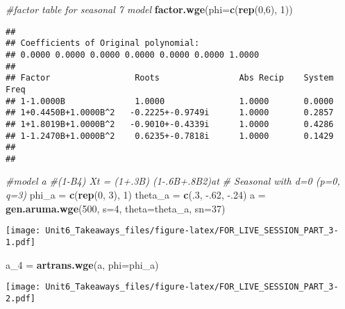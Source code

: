 \documentclass[
]{article}
\newenvironment{Shaded}{\begin{snugshade}}{\end{snugshade}}
\newcommand{\CommentTok}[1]{\textcolor[rgb]{0.56,0.35,0.01}{\textit{#1}}}
\newcommand{\DataTypeTok}[1]{\textcolor[rgb]{0.13,0.29,0.53}{#1}}
\newcommand{\DecValTok}[1]{\textcolor[rgb]{0.00,0.00,0.81}{#1}}
\newcommand{\FloatTok}[1]{\textcolor[rgb]{0.00,0.00,0.81}{#1}}
\newcommand{\KeywordTok}[1]{\textcolor[rgb]{0.13,0.29,0.53}{\textbf{#1}}}
\newcommand{\NormalTok}[1]{#1}
\newcommand{\StringTok}[1]{\textcolor[rgb]{0.31,0.60,0.02}{#1}}
\begin{document}
\begin{Shaded}
\begin{Highlighting}[]
\CommentTok{#factor table for seasonal 7 model}
\KeywordTok{factor.wge}\NormalTok{(}\DataTypeTok{phi=}\KeywordTok{c}\NormalTok{(}\KeywordTok{rep}\NormalTok{(}\DecValTok{0}\NormalTok{,}\DecValTok{6}\NormalTok{), }\DecValTok{1}\NormalTok{))}
\end{Highlighting}
\end{Shaded}

\begin{verbatim}
## 
## Coefficients of Original polynomial:  
## 0.0000 0.0000 0.0000 0.0000 0.0000 0.0000 1.0000 
## 
## Factor                 Roots                Abs Recip    System Freq 
## 1-1.0000B              1.0000               1.0000       0.0000
## 1+0.4450B+1.0000B^2   -0.2225+-0.9749i      1.0000       0.2857
## 1+1.8019B+1.0000B^2   -0.9010+-0.4339i      1.0000       0.4286
## 1-1.2470B+1.0000B^2    0.6235+-0.7818i      1.0000       0.1429
##   
## 
\end{verbatim}

\begin{Shaded}
\begin{Highlighting}[]
\CommentTok{#model a}
\CommentTok{#(1-B4) Xt = (1+.3B) (1-.6B+.8B2)at}
\CommentTok{# Seasonal with d=0 (p=0, q=3)}
\NormalTok{phi_a =}\StringTok{ }\KeywordTok{c}\NormalTok{(}\KeywordTok{rep}\NormalTok{(}\DecValTok{0}\NormalTok{, }\DecValTok{3}\NormalTok{), }\DecValTok{1}\NormalTok{)}
\NormalTok{theta_a =}\StringTok{ }\KeywordTok{c}\NormalTok{(.}\DecValTok{3}\NormalTok{, }\FloatTok{-.62}\NormalTok{, }\FloatTok{-.24}\NormalTok{)}
\NormalTok{a =}\StringTok{ }\KeywordTok{gen.aruma.wge}\NormalTok{(}\DecValTok{500}\NormalTok{, }\DataTypeTok{s=}\DecValTok{4}\NormalTok{, }\DataTypeTok{theta=}\NormalTok{theta_a, }\DataTypeTok{sn=}\DecValTok{37}\NormalTok{)}
\end{Highlighting}
\end{Shaded}

\texttt{[image: Unit6\_Takeaways\_files/figure-latex/FOR\_LIVE\_SESSION\_PART\_3-1.pdf]}

\begin{Shaded}
\begin{Highlighting}[]
\NormalTok{a_}\DecValTok{4}\NormalTok{ =}\StringTok{ }\KeywordTok{artrans.wge}\NormalTok{(a, }\DataTypeTok{phi=}\NormalTok{phi_a)}
\end{Highlighting}
\end{Shaded}

\texttt{[image: Unit6\_Takeaways\_files/figure-latex/FOR\_LIVE\_SESSION\_PART\_3-2.pdf]}
\end{document}
